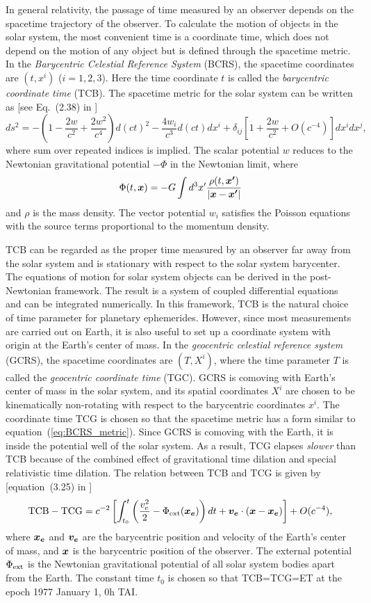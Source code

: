 \documentclass[12pt]{article}
\newcommand \beq {\begin{equation}}
\newcommand \eeq {\end{equation}}
\newcommand{\ve}[1]{\mbox{\boldmath $#1$}}
\newcommand{\expl}{\cite{expl}}
\begin{document}
\begin{CJK}{UTF8}{bkai}
In general relativity, the passage of time measured by an observer depends 
on the spacetime trajectory of the observer. To calculate the motion of objects 
in the solar system, the most convenient time is a coordinate time, which does 
not depend on the motion of any object but is defined through the spacetime metric. 
In the {\em Barycentric Celestial Reference System} (BCRS), the spacetime coordinates 
are $(t,x^i)$ ($i=1,2,3$). Here the time coordinate $t$ is called the {\em barycentric 
coordinate time} (TCB). The spacetime metric for the solar system can be written as 
[see Eq.~(2.38) in \expl ]
\beq
  ds^2 = -\left( 1 - \frac{2w}{c^2} + \frac{2w^2}{c^4}\right) d(ct)^2 
- \frac{4 w_i}{c^3} d(ct) dx^i + \delta_{ij}\left[ 1 + \frac{2w}{c^2} 
+ O(c^{-4})\right] dx^i dx^j ,
\label{eq:BCRS_metric}
\eeq
where sum over repeated indices is implied. The scalar potential $w$ reduces to the 
Newtonian gravitational potential $-\Phi$ in the Newtonian limit, where 
\beq
\Phi(t,\ve{x}) = -G\int d^3x' \frac{\rho(t,\ve{x'})}{|\ve{x}-\ve{x'}|} 
\eeq
and $\rho$ is the mass density. The vector potential $w_i$ satisfies 
the Poisson equations with the source terms proportional to the momentum 
density. 

TCB can be regarded as the proper time measured by an observer far away 
from the solar system and is stationary with respect to the solar system 
barycenter. The equations of motion for solar system objects can be 
derived in the post-Newtonian framework. 
The result is a system of coupled differential equations and can be 
integrated numerically. In this framework, TCB is the natural choice of 
time parameter for planetary ephemerides. However, since most measurements 
are carried out on Earth, it is also useful to set up a coordinate system 
with origin at the Earth's center of mass. In the {\em geocentric celestial 
reference system} (GCRS), the spacetime coordinates are $(T,X^i)$, where 
the time parameter $T$ is called the {\em geocentric coordinate time} (TGC). 
GCRS is comoving with Earth's center of mass in the solar system, 
and its spatial coordinates 
$X^i$ are chosen to be kinematically non-rotating with respect to the 
barycentric coordinates $x^i$. The coordinate time TCG is chosen so that 
the spacetime metric has a form similar to equation~(\ref{eq:BCRS_metric}). 
Since GCRS is comoving with the Earth, it is inside the potential well 
of the solar system. As a result, TCG elapses {\em slower} than TCB because 
of the combined effect of gravitational time dilation and special relativistic 
time dilation. The relation between TCB and TCG is given by 
[equation~(3.25) in \expl ]
\beq
  {\rm TCB} - {\rm TCG} = c^{-2} \left[ \int_{t_0}^t \left( \frac{v_e^2}{2} 
- \Phi_{\rm ext}(\ve{x_e}) 
\right) dt + \ve{v_e} \cdot (\ve{x}-\ve{x_e})\right] + O(c^{-4}) ,
\label{eq:TCG}
\eeq
where $\ve{x_e}$ and $\ve{v_e}$ are the barycentric position and velocity of the Earth's 
center of mass, and $\ve{x}$ is the barycentric position of the observer. 
The external potential $\Phi_{\rm ext}$ is the Newtonian gravitational potential 
of all solar system bodies apart from the Earth. The constant time $t_0$ is chosen 
so that TCB=TCG=ET at the epoch 1977 January 1, 0h TAI. 


\end{CJK}
\end{document}
